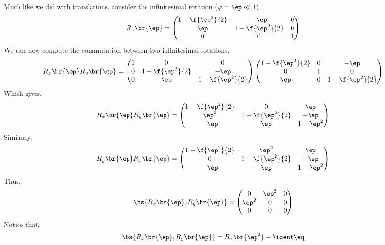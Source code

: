 \documentclass{article}
\begin{document}
Much like we did with translations, consider the infinitesimal rotation ($\varphi = \ep \ll 1$).
\[ R_{z}\br{\ep} = \begin{pmatrix}
    1 - \f{\ep^2}{2} & - \ep & 0 \\
    \ep & 1 - \f{\ep^2}{2} & 0 \\
    0 & 0 & 1 \\
\end{pmatrix} \]
We can now compute the commutation between two infinitesimal rotations.
\[ R_{x}\br{\ep}R_{y}\br{\ep} = \begin{pmatrix}
    1 & 0 & 0 \\
    0 & 1 - \f{\ep^2}{2} & - \ep \\
    0 & \ep & 1 - \f{\ep^2}{2} \\
\end{pmatrix}\begin{pmatrix}
    1 - \f{\ep^2}{2} & 0 & - \ep \\
    0 & 1 & 0 \\
    \ep & 0 & 1 - \f{\ep^2}{2} \\
\end{pmatrix} \]
Which gives,
\[ R_{x}\br{\ep}R_{y}\br{\ep} = \begin{pmatrix}
    1 - \f{\ep^2}{2} & 0 & \ep \\
    \ep^2 & 1 - \f{\ep^2}{2} & -\ep \\
    -\ep & \ep & 1 - \ep^2 \\
\end{pmatrix} \]
Similarly,
\[ R_{y}\br{\ep}R_{x}\br{\ep} = \begin{pmatrix}
    1 - \f{\ep^2}{2} & \ep^2 & \ep \\
    0 & 1 - \f{\ep^2}{2} & -\ep \\
    -\ep & \ep & 1 - \ep^2 \\
\end{pmatrix} \]
Thus,
\[ \bs{R_{x}\br{\ep}, R_{y}\br{\ep}} = \begin{pmatrix}
    0 & \ep^2 & 0 \\
    \ep^2 & 0 & 0 \\
    0 & 0 & 0 \\
\end{pmatrix} \]
Notice that,
\[ \bs{R_{x}\br{\ep}, R_{y}\br{\ep}} = R_{x}\br{\ep^2} - \ident \eq \label{eq:rotation_infinitesimal} \]
\end{document}
